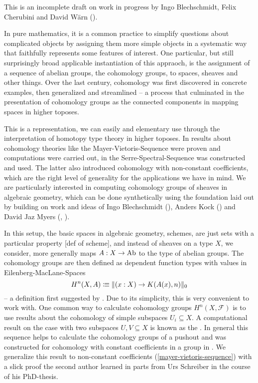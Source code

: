 This is an incomplete draft on work in progress by Ingo Blechschmidt, Felix Cherubini and David Wärn (\cite{chech-draft}).

In pure mathematics,
it is a common practice to simplify questions about complicated objects
by assigning them more simple objects in a systematic way that faithfully represents some features of interest.
One particular, but still surprisingly broad applicable instantiation of this appraoch,
is the assignment of a sequence of abelian groups, the cohomology groups, to spaces, sheaves and other things.
Over the last century, cohomology was first discovered in concrete examples, then generalized and streamlined --
a process that culminated in the presentation of cohomology groups as the connected components in mapping spaces in higher toposes.

This is a representation, we can easily and elementary use through the interpretation of homotopy type theory in higher toposes.
In \cite{evan-master-thesis} results about cohomology theories like the Mayer-Vietoris-Sequence were proven and computations were carried out,
in \cite{floris-thesis} the Serre-Spectral-Sequence was constructed and used.
The latter also introduced cohomology with non-constant coefficients,
which are the right level of generality for the applications we have in mind.
We are particularly interested in computing cohomology groups of sheaves in algebraic geometry,
which can be done synthetically using the foundation laid out by \cite{draft}
building on work and ideas of Ingo Blechschmidt (\cite{ingo-thesis}), Anders Kock (\cite{kock-sdg})
and David Jaz Myers (\cite{myers-talk1}, \cite{myers-talk2}).

In this setup, the basic spaces in algebraic geometry, schemes, are just sets with a particular property \cite{draft}[def of scheme],
and instead of sheaves on a type $X$, we consider, more generally maps $A:X\to\operatorname{Ab}$ to the type of abelian groups.
The cohomology groups are then defined as dependent function types with values in Eilenberg-MacLane-Spaces
\[ H^n(X,A)\vcentcolon\mspace{-1.2mu}\equiv \|(x:X)\to K(A(x),n)\|_0\]
-- a definition first suggested by \cite{mike-blogpost}.
Due to its simplicity, this is very convenient to work with.
One common way to calculate cohomology groups $H^n(X,\mathcal F)$ is to
use results about the cohomology of simple subspaces $U_i\subseteq X$.
A computational result on the case with two subspaces $U,V\subseteq X$ is known as the .
In general this sequence helps to calculate the cohomology groups of a pushout
and was constructed for cohomology with constant coefficients in a group in \cite{evan-master-thesis}.
We generalize this result to non-constant coefficients (\cref{mayer-vietoris-sequence})
with a slick proof the second author learned in parts from Urs Schreiber in the course of his PhD-thesis.

